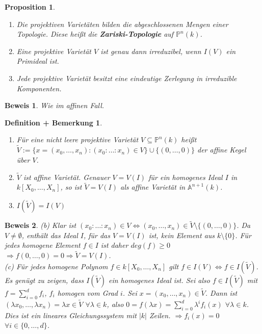 \documentclass[a4paper,12pt]{report}
\theoremstyle{break}
\newtheorem{DefBem}[Def]{Definition + Bemerkung}
\newtheorem{Prop}[Def]{Proposition}
\theoremstyle{nonumberbreak}
\theoremstyle{nonumberplain}
\newtheorem{Bew}{Beweis}
\newcommand{\emp}[1]{\textbf{\emph{#1}}}
\newcommand{\begriff}[1]{{\index{#1}}\emp{#1}}
\begin{document}
\begin{Prop}
 \label{prop:8.8}
 \begin{enumerate}
  \item Die projektiven Varietäten bilden die abgeschlossenen Mengen einer Topologie. Diese heißt die \begriff{Zariski-Topologie} auf $\mathbb P^n(k)$.
  \item Eine projektive Varietät $V$ ist genau dann irreduzibel, wenn $I(V)$ ein Primideal ist.
  \item Jede projektive Varietät besitzt eine eindeutige Zerlegung in irreduzible Komponenten.
 \end{enumerate}
\end{Prop}
\begin{Bew}
 Wie im affinen Fall.
\end{Bew}

\begin{DefBem}
 \label{defbem:8.10}
 \begin{enumerate}
  \item Für eine nicht leere projektive Varietät $V \subseteq \mathbb P^n(k)$ heißt \\
   $\tilde{V}:=\{x = (x_0,\dots ,x_n): (x_0: \dots : x_n) \in V \} \cup \{(0, \dots, 0)\}$ der affine Kegel über $V$.
  \item $\tilde{V}$ ist affine Varietät. Genauer $V=V(I)$ für ein homogenes Ideal  $I$ in $k[X_0,\dots,X_n]$, so ist $\tilde{V}=V(I)$ als affine Varietät in $\mathbb A^{n+1}(k)$.
  \item $I(\tilde{V})=I(V)$
 \end{enumerate}
\end{DefBem}
\begin{Bew}
 (b) Klar ist $(x_0:\dots:x_n) \in V \Leftrightarrow (x_0, \dots , x_n) \in \tilde{V} \setminus \{(0,\dots,0)\}$. Da $V \ne \emptyset$, enthält das Ideal $I$, für das $V = V(I)$ ist, kein Element aus $k\setminus\{0\}$. Für jedes homogene Element $f \in I$ ist daher $deg(f) \ge 0$ $\Rightarrow f(0, \dots ,0)=0 \Rightarrow \tilde{V}=V(I)$. \\
 (c) Für jedes homogene Polynom $f \in k[X_0, \dots ,X_n]$ gilt $f \in I(V) \Leftrightarrow f \in I(\tilde{V})$. Es genügt zu zeigen, dass $I(\tilde{V})$ ein homogenes Ideal ist. Sei also $f \in I(\tilde{V})$ mit $f= \sum_{i=0}^d{f_i}$, $f_i$ homogen vom Grad $i$. Sei $x=(x_0, \dots, x_n) \in \tilde{V}$. Dann ist $(\lambda x_0, \dots , \lambda x_n) = \lambda x \in \tilde{V}$ $\forall \lambda \in k$, also $0 = f(\lambda x) = \sum_{i=0}^d{\lambda^i f_i(x)}$ $\forall \lambda \in k$. Dies ist ein lineares Gleichungssystem mit $|k|$ Zeilen. $\Rightarrow f_i(x)=0$ $\forall i \in \{0, \dots, d\}$.
\end{Bew}
\end{document}
